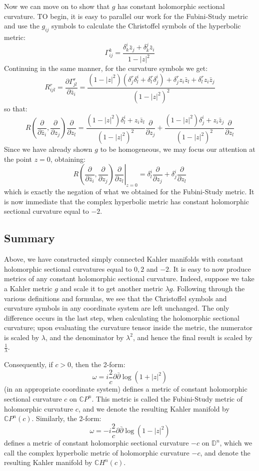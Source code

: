 \documentclass[11pt]{amsart}
\theoremstyle{definition}
\def \CP{ \mathbb{C}P }
\def \CH{ \mathbb{C}H }
\def \del{ \partial }
\def \delbar{ \bar{\partial} }
\def \disk{ \mathbb{D} }
\begin{document}
Now we can move on to show that $g$ has constant holomorphic sectional curvature.  TO begin, it is easy to parallel our work for the Fubini-Study metric and use the $g_{ij}$ symbols to calculate the Christoffel symbols of the hyperbolic metric:
%
$$ \Gamma_{ij}^k = \frac{ \delta^i_k \bar{z}_j + \delta^j_k \bar{z}_i }{ 1 - |z|^2 } $$
%
Continuing in the same manner, for the curvature symbols we get:
%
$$ R_{ijl}^r = \frac{ \del \Gamma_{jl}^r }{ \del \bar{z}_i } = \frac{ ( 1 - |z|^2 )( \delta^r_j \delta^i_l + \delta^r_l \delta^i_j ) + \delta^r_j z_i \bar{z}_l + \delta^r_l z_i \bar{z}_j }{ ( 1 - |z|^2 )^2 } $$
%
so that:
%
$$ R \left( \frac{ \del }{ \del \bar{z}_i },\frac{ \del }{ \del z_j } \right) \frac{ \del }{ \del z_l } = \frac{ ( 1 - |z|^2 ) \delta^i_l + z_i \bar{z}_l }{ (1 - |z|^2)^2 } \frac{ \del }{ \del z_j } + \frac{ ( 1 - |z|^2 ) \delta^i_j + z_i \bar{z}_j }{ (1 - |z|^2)^2 } \frac{ \del }{ \del z_l } $$
%
Since we have already shown $g$ to be homogeneous, we may focus our attention at the point $z=0$, obtaining:
%
$$  \left. R \left( \frac{ \del }{ \del \bar{z}_i },\frac{ \del }{ \del z_j } \right) \frac{ \del }{ \del z_l } \right|_{z=0} =  \delta^i_l \frac{ \del }{ \del z_j } + \delta^i_j \frac{ \del }{ \del z_l } $$
%
which is exactly the negation of what we obtained for the Fubini-Study metric.  It is now immediate that the complex hyperbolic metric has constant holomorphic sectional curvature equal to $-2$.

\subsection{ Summary }  
Above, we have constructed simply connected Kahler manifolds with constant holomorphic sectional curvatures equal to $0,2$ and $-2$.  It is easy to now produce metrics of any constant holomorphic sectional curvature.  Indeed, suppose we take a Kahler metric $g$ and scale it to get another metric $\lambda g$.  Following through the various definitions and formulas, we see that the Christoffel symbols and curvature symbols in any coordinate system are left unchanged.  The only difference occurs in the last step, when calculating the holomorphic sectional curvature; upon evaluating the curvature tensor inside the metric, the numerator is scaled by $\lambda$, and the denominator by $\lambda^2$, and hence the final result is scaled by $\frac{1}{\lambda}$.

Consequently, if $c > 0$, then the 2-form:
%
$$ \omega = i \frac{2}{c} \del \delbar \log ( 1 + |z|^2 ) $$
%
(in an appropriate coordinate system) defines a metric of constant holomorphic sectional curvature $c$ on $\CP^n$.  This metric is called the Fubini-Study metric of holomorphic curvature $c$, and we denote the resulting Kahler manifold by $\CP^n(c)$.  Similarly, the 2-form:
%
$$ \omega = - i \frac{2}{c} \del \delbar \log ( 1 - |z|^2 ) $$
%
defines a metric of constant holomorphic sectional curvature $-c$ on $\disk^n$, which we call the complex hyperbolic metric of holomorphic curvature $-c$, and denote the resulting Kahler manifold by $\CH^n (c)$.
\end{document}
